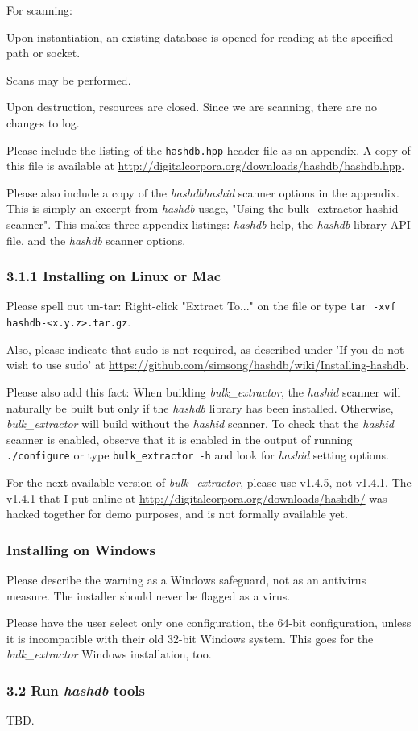 \documentclass[12pt,twoside]{article}
\newcommand{\hdb}{\emph{hashdb}\xspace}
\newcommand{\bulk}{\emph{bulk\_extractor}\xspace}
\newcommand{\hid}{\emph{hashid}\xspace}
\begin{document}
For scanning:
\begin{compactitem}
\item Upon instantiation, an existing database is opened for reading
at the specified path or socket.
\item Scans may be performed.
\item Upon destruction, resources are closed.
Since we are scanning, there are no changes to log.
\end{compactitem}

Please include the listing of the \texttt{hashdb.hpp} header file
as an appendix.
A copy of this file is available at
\url{http://digitalcorpora.org/downloads/hashdb/hashdb.hpp}.

Please also include a copy of the \hdb \hid scanner options in the appendix.
This is simply an excerpt from \hdb usage,
"Using the bulk\_extractor hashid scanner".
This makes three appendix listings: \hdb help, the \hdb library API file,
and the \hdb scanner options.

\subsubsection*{3.1.1 Installing on Linux or Mac}
Please spell out un-tar: Right-click "Extract To..." on the file
or type \texttt{tar -xvf hashdb-<x.y.z>.tar.gz}.

Also, please indicate that sudo is not required, as described under
'If you do not wish to use sudo' at
\url{https://github.com/simsong/hashdb/wiki/Installing-hashdb}.

Please also add this fact:
When building \bulk, the \hid scanner will naturally be built
but only if the \hdb library has been installed.
Otherwise, \bulk will build without the \hid scanner.
To check that the \hid scanner is enabled,
observe that it is enabled in the output of running \texttt{./configure}
or type \texttt{bulk\_extractor -h} and look for \hid setting options.

For the next available version of \bulk,
please use v1.4.5, not v1.4.1.
The v1.4.1 that I put online at
\url{http://digitalcorpora.org/downloads/hashdb/}
was hacked together for demo purposes,
and is not formally available yet.

\subsubsection*{Installing on Windows}
Please describe the warning as a Windows safeguard,
not as an antivirus measure.
The installer should never be flagged as a virus.

Please have the user select only one configuration,
the 64-bit configuration, unless it is incompatible with their old 32-bit
Windows system.
This goes for the \bulk Windows installation, too.

\subsubsection*{3.2 Run \hdb tools}
TBD.
\end{document}

